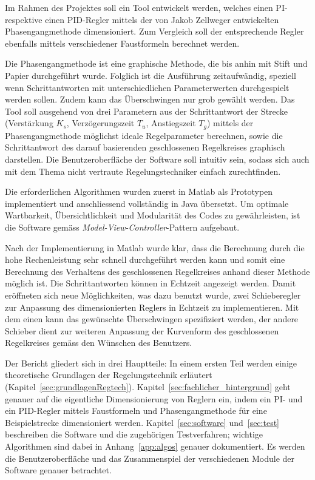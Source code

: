 Im Rahmen  des Projektes soll  ein Tool  entwickelt werden, welches  einen PI-
respektive  einen  PID-Regler mittels  der  von  Jakob Zellweger  entwickelten
Phasengangmethode dimensioniert. Zum  Vergleich soll der  entsprechende Regler
ebenfalls mittels verschiedener Faustformeln berechnet werden.

Die Phasengangmethode ist eine graphische Methode, die bis anhin mit Stift und
Papier  durchgef\"uhrt wurde. Folglich  ist die  Ausf\"uhrung zeitaufw\"andig,
speziell   wenn   Schrittantworten   mit   unterschiedlichen   Parameterwerten
durchgespielt werden sollen. Zudem kann das \"Uberschwingen nur grob gew\"ahlt
werden. Das Tool soll ausgehend von drei Parametern aus der Schrittantwort der
Strecke  (Verst\"arkung $K_s$,  Verz\"ogerungszeit $T_u$,  Anstiegszeit $T_g$)
mittels  der Phasengangmethode  m\"oglichst  ideale Regelparameter  berechnen,
sowie  die Schrittantwort  des darauf  basierenden geschlossenen  Regelkreises
graphisch  darstellen. Die  Benutzeroberfl\"ache  der Software  soll  intuitiv
sein,  sodass  sich auch  mit  dem  Thema nicht  vertraute  Regelungstechniker
einfach zurechtfinden.

Die    erforderlichen    Algorithmen    wurden   zuerst    in    Matlab    als
Prototypen   implementiert    und   anschliessend   vollst\"andig    in   Java
\"ubersetzt. Um  optimale Wartbarkeit,  \"Ubersichtlichkeit und  Modularit\"at
des    Codes     zu    gew\"ahrleisten,    ist    die     Software    gem\"ass
\emph{Model-View-Controller}-Pattern aufgebaut.

Nach  der Implementierung  in Matlab  wurde  klar, dass  die Berechnung  durch
die  hohe Rechenleistung  sehr schnell  durchgef\"uhrt werden  kann und  somit
eine Berechnung  des Verhaltens  des geschlossenen Regelkreises  anhand dieser
Methode  m\"oglich ist. Die  Schrittantworten k\"onnen  in Echtzeit  angezeigt
werden. Damit er\"offneten sich neue  M\"oglichkeiten, was dazu benutzt wurde,
zwei  Schieberegler  zur Anpassung  des  dimensionierten  Reglers in  Echtzeit
zu  implementieren. Mit  dem  einen   kann  das  gew\"unschte  \"Uberschwingen
spezifiziert  werden,  der  andere   Schieber  dient  zur  weiteren  Anpassung
der  Kurvenform des  geschlossenen  Regelkreises gem\"ass  den W\"unschen  des
Benutzers.

Der      Bericht      gliedert      sich      in      drei      Hauptteile: In
einem     ersten     Teil     werden    einige     theoretische     Grundlagen
der   Regelungstechnik    erl\"autert   (Kapitel~\ref{sec:grundlagenRegtech}).
Kapitel~\ref{sec:fachlicher_hintergrund}  geht  genauer  auf  die  eigentliche
Dimensionierung  von Reglern  ein, indem  ein PI-  und ein  PID-Regler mittels
Faustformeln  und Phasengangmethode  f\"ur eine  Beispielstrecke dimensioniert
werden.    Kapitel~\ref{sec:software}   und~\ref{sec:test}   beschreiben   die
Software  und  die  zugeh\"origen  Testverfahren;  wichtige  Algorithmen  sind
dabei   in   Anhang~\ref{app:algos}   genauer  dokumentiert. Es   werden   die
Benutzeroberfl\"ache  und  das  Zusammenspiel  der  verschiedenen  Module  der
Software genauer betrachtet.
